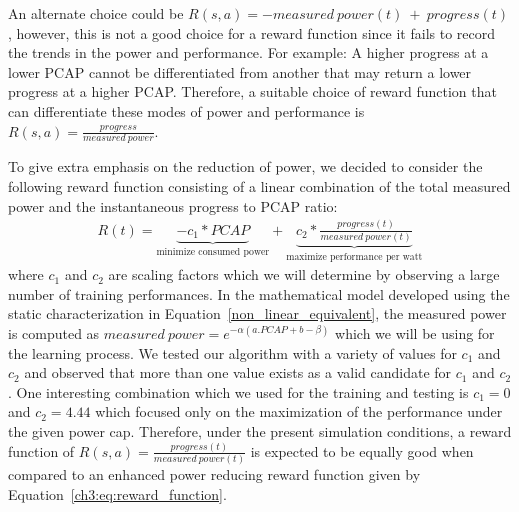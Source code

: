 An alternate choice could be $R(s,a) = - measured \ power(t) \ + \ progress(t)$, however, this is not a good choice for a reward function since it fails to record the trends in the power and performance. For example: A higher progress at a lower PCAP cannot be differentiated from another that may return a lower progress at a higher PCAP. Therefore, a suitable choice of reward function that can differentiate these modes of power and performance is $R(s,a) = \frac{progress}{measured \ power}$.   

To give extra emphasis on the reduction of power, we decided to consider the following reward function consisting of a linear combination of the total measured power and the instantaneous progress to PCAP ratio:
\begin{equation}
                \begin{aligned}
                            R(t) = \underbrace{-c_1* PCAP}_{\text{minimize consumed power}} + \underbrace{c_2 * \frac{progress(t)}{measured \ power (t)}}_{\text{maximize performance per watt}}
                \end{aligned}
                \label{ch3:eq:reward_function}
            \end{equation}
where $c_1$ and $c_2$ are scaling factors which we will determine by observing a large number of training performances. In the mathematical model developed using the static characterization in Equation~\ref{non_linear_equivalent}, the measured power is computed as $measured \ power = e^{-\alpha(a.PCAP+b-\beta)}$ which we will be using for the learning process.  
We tested our algorithm with a variety of values for $c_1$ and $c_2$ and observed that more than one value exists as a valid candidate for $c_1$ and $c_2$. One interesting combination which we used for the training and testing is $c_1 = 0$ and $c_2 = 4.44$ which focused only on the maximization of the performance under the given power cap. Therefore, under the present simulation conditions, a reward function of $R(s,a) = \frac{progress(t)}{measured \ power (t)}$ is expected to be equally good when compared to an enhanced power reducing reward function given by Equation~\ref{ch3:eq:reward_function}.

